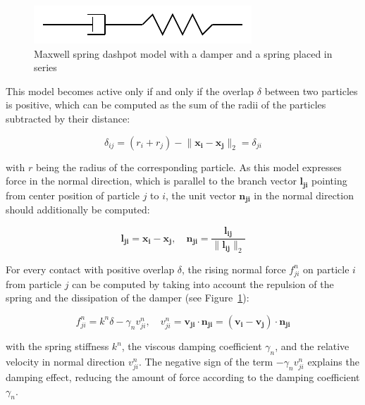 \documentclass[11pt,
               a4paper,
               bibtotoc,
               idxtotoc,
               headsepline,
               footsepline,
               footexclude,
               BCOR12mm,
               DIV13,
               openany,   %
               ]
               {scrbook}
\begin{document}
 \begin{figure}[H] %
	\centering
	\includegraphics[width=.3\columnwidth]{figures/maxwell_spring_dashpot.pdf}
	\caption[Example Figure]{Maxwell spring dashpot model with a damper and a spring placed in series}
	\label{fig:maxwell_spring_dashpot} %
\end{figure}

This model becomes active only if and only if the overlap $\delta$ between two particles is positive, which can be computed as the sum of the radii of the particles subtracted by their distance:

\begin{equation}
	\delta_{ij} = (r_i + r_j) - \lVert \mathbf{x_i} -\mathbf{ x_j} \rVert_2 = \delta_{ji}
\end{equation}

with $r$ being the radius of the corresponding particle.
As this model expresses force in the normal direction, which is parallel to the branch vector $\mathbf{l_{ji}}$ pointing from center position of particle $j$ to $i$, the unit vector $\mathbf{n_{ji}}$ in the normal direction should additionally be computed:

\begin{equation}
	\mathbf{l_{ji}} =  \mathbf{x_i} - \mathbf{x_j}, \quad \mathbf{n_{ji}} =\frac{\mathbf{l_{ij}}}{\lVert \mathbf{l_{ij}} \rVert_2}
\end{equation}

For every contact with positive overlap $\delta$, the rising normal force $f_{ji}^n$ on particle $i$ from particle $j$ can be computed by taking into account the repulsion of the spring and the dissipation of the damper (see Figure~\ref{fig:maxwell_spring_dashpot}):

\begin{equation}
	f_{ji}^n = k^n\delta - \gamma_n v_{ji}^n, \quad v_{ji}^n = \mathbf{v_{ji}} \cdot \mathbf{n_{ji}} = (\mathbf{v_i} - \mathbf{v_j}) \cdot \mathbf{n_{ji}}
\end{equation}

with the spring stiffness $k^n$, the viscous damping coefficient $\gamma_n$, and the relative velocity in normal direction $v_{ji}^n$. The negative sign of the term $-\gamma_n v_{ji}^n$ explains the damping effect, reducing the amount of force according to the damping coefficient $\gamma_n$.
\end{document}
